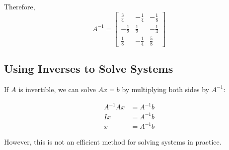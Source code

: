 \documentclass[12pt,a4paper]{article}
\begin{document}
Therefore, 
\[A^{-1} = \begin{bmatrix}
\frac{3}{4} & -\frac{1}{4} & -\frac{1}{8} \\
-\frac{1}{2} & \frac{1}{2} & -\frac{1}{4} \\
\frac{1}{8} & -\frac{1}{4} & \frac{5}{8}
\end{bmatrix}\]

\subsection{Using Inverses to Solve Systems}

If $A$ is invertible, we can solve $Ax = b$ by multiplying both sides by $A^{-1}$:

\begin{align*}
    A^{-1}Ax &= A^{-1}b \\
    Ix &= A^{-1}b \\
    x &= A^{-1}b
\end{align*}

However, this is not an efficient method for solving systems in practice.
\end{document}
